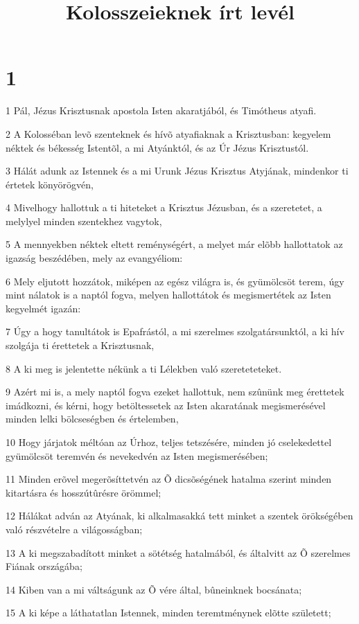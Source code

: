 

\title{Kolosszeieknek írt levél}


\chapter{1}

\par 1 Pál, Jézus Krisztusnak apostola Isten akaratjából, és Timótheus atyafi.
\par 2 A Kolosséban levõ szenteknek és hívõ atyafiaknak a Krisztusban: kegyelem néktek és békesség Istentõl, a mi Atyánktól, és az Úr Jézus Krisztustól.
\par 3 Hálát adunk az Istennek és a mi Urunk Jézus Krisztus Atyjának, mindenkor ti értetek könyörögvén,
\par 4 Mivelhogy hallottuk a ti hiteteket a Krisztus Jézusban, és a szeretetet, a melylyel minden szentekhez vagytok,
\par 5 A mennyekben néktek eltett reménységért, a melyet már elõbb hallottatok az igazság beszédében, mely az evangyéliom:
\par 6 Mely eljutott hozzátok, miképen az egész világra is, és gyümölcsöt terem, úgy mint nálatok is a naptól fogva, melyen hallottátok és megismertétek az Isten kegyelmét igazán:
\par 7 Úgy a hogy tanultátok is Epafrástól, a mi szerelmes szolgatársunktól, a ki hív szolgája ti érettetek a Krisztusnak,
\par 8 A ki meg is jelentette nékünk a ti Lélekben való szereteteteket.
\par 9 Azért mi is, a mely naptól fogva ezeket hallottuk, nem szûnünk meg érettetek imádkozni, és kérni, hogy betöltessetek az Isten akaratának megismerésével minden lelki bölcseségben és értelemben,
\par 10 Hogy járjatok méltóan az Úrhoz, teljes tetszésére, minden jó cselekedettel gyümölcsöt teremvén és nevekedvén az Isten megismerésében;
\par 11 Minden erõvel megerõsíttetvén az Õ dicsõségének hatalma szerint minden kitartásra és hosszútûrésre örömmel;
\par 12 Hálákat adván az Atyának, ki alkalmasakká tett minket a szentek örökségében való részvételre a világosságban;
\par 13 A ki megszabadított minket a sötétség hatalmából, és általvitt az Õ szerelmes Fiának országába;
\par 14 Kiben van a mi váltságunk az Õ vére által, bûneinknek bocsánata;
\par 15 A ki képe a láthatatlan Istennek, minden teremtménynek elõtte született;

